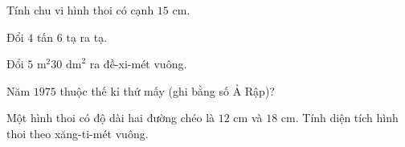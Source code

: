 \begin{ex} %
Tính chu vi hình thoi có cạnh $15\text{ cm}$.
\end{ex}

\begin{ex} %
Đổi $4$ tấn $6$ tạ ra tạ.
\end{ex}

\begin{ex} %
Đổi $5\text{ m}^2 30\text{ dm}^2$ ra đề-xi-mét vuông.
\end{ex}

\begin{ex} %
Năm $1975$ thuộc thế kỉ thứ mấy (ghi bằng số Ả Rập)?
\end{ex}

\begin{ex} %
Một hình thoi có độ dài hai đường chéo là $12\text{ cm}$ và $18\text{ cm}$. Tính diện tích hình thoi theo xăng-ti-mét vuông.
\end{ex}
